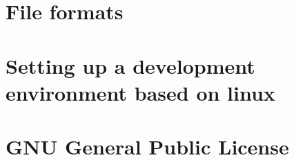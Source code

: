 \documentclass[a4paper,12pt]{refrep}
\begin{document}
\chapter{File formats}\label{cha:file_formats}





\appendix

\chapter{Setting up a development environment based on linux}\label{cha:developmentsetup}


\chapter{GNU General Public License}\label{cha:gnu-general-public}

\end{document}
